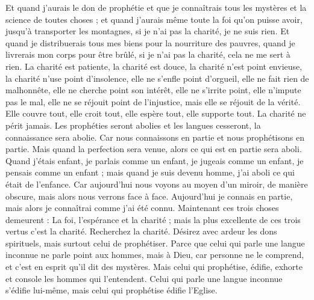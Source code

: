 \begin{multicols}{2}
Et quand j'aurais le don de prophétie et que je connaîtrais tous les mystères et la science de toutes choses ; et quand j'aurais même toute la foi qu'on puisse avoir, jusqu’à transporter les montagnes, si je n'ai pas la charité, je ne suis rien.
Et quand je distribuerais tous mes biens pour la nourriture des pauvres, quand je livrerais mon corps pour être brûlé, si je n'ai pas la charité, cela ne me sert à rien.
La charité est patiente, la charité est douce, la charité n'est point envieuse, la charité n'use point d'insolence, elle ne s’enfle point d’orgueil,
elle ne fait rien de malhonnête, elle ne cherche point son intérêt, elle ne s’irrite point, elle n’impute pas le mal,
elle ne se réjouit point de l'injustice, mais elle se réjouit de la vérité.
Elle couvre tout, elle croit tout, elle espère tout, elle supporte tout.
La charité ne périt jamais. Les prophéties seront abolies et les langues cesseront, la connaissance sera abolie.
Car nous connaissons en partie et nous prophétisons en partie.
Mais quand la perfection sera venue, alors ce qui est en partie sera aboli.
Quand j'étais enfant, je parlais comme un enfant, je jugeais comme un enfant, je pensais comme un enfant ; mais quand je suis devenu homme, j'ai aboli ce qui était de l'enfance.
Car aujourd’hui nous voyons au moyen d’un miroir, de manière obscure, mais alors nous verrons face à face. Aujourd’hui je connais en partie, mais alors je connaîtrai comme j'ai été connu.
Maintenant ces trois choses demeurent : La foi, l'espérance et la charité ; mais la plus excellente de ces trois vertus c'est la charité.
\VerseOne{}Recherchez la charité. Désirez avec ardeur les dons spirituels, mais surtout celui de prophétiser.
Parce que celui qui parle une langue inconnue ne parle point aux hommes, mais à Dieu, car personne ne le comprend, et c’est en esprit qu’il dit des mystères.
Mais celui qui prophétise, édifie, exhorte et console les hommes qui l'entendent.
Celui qui parle une langue inconnue s'édifie lui-même, mais celui qui prophétise édifie l'Eglise.

\end{multicols}
